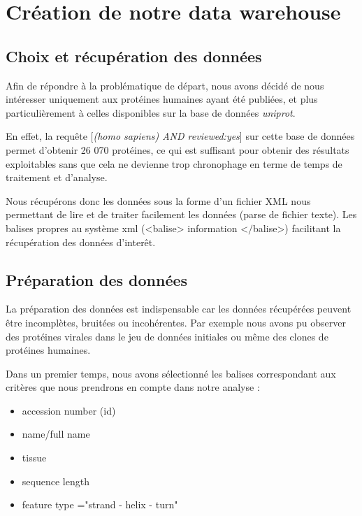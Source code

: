 \section*{Création de notre data warehouse}

\subsection*{Choix et récupération des données}


Afin de répondre à la problématique de départ, nous avons décidé de nous intéresser uniquement aux protéines humaines ayant été publiées, et plus particulièrement à celles disponibles sur la base de données \emph{uniprot}.

En effet, la requête [\emph{(homo sapiens) AND reviewed:yes}] sur cette base de données permet d'obtenir 26 070 protéines, ce qui est suffisant pour obtenir des résultats exploitables sans que cela ne devienne trop chronophage en terme de temps de traitement et d'analyse.

Nous récupérons donc les données sous la forme d'un fichier XML nous permettant de lire et de traiter facilement les données (parse de fichier texte). Les balises propres au système xml (<balise> information <$/$balise>) facilitant la récupération des données d'inter\^et.

\subsection*{Préparation des données}

La préparation des données est indispensable car les données récupérées peuvent être incomplètes, bruitées ou incohérentes. Par exemple nous avons pu observer des protéines virales dans le jeu de données initiales ou même des clones de protéines humaines.

Dans un premier temps, nous avons sélectionné les balises correspondant aux critères que nous prendrons en compte dans notre analyse :
\renewcommand\labelitemi{\textbullet}
\begin{itemize}
\item accession number (id)
\item name/full name
\item tissue
\item sequence length
\item feature type ="strand  - helix - turn"\\
\end{itemize}

